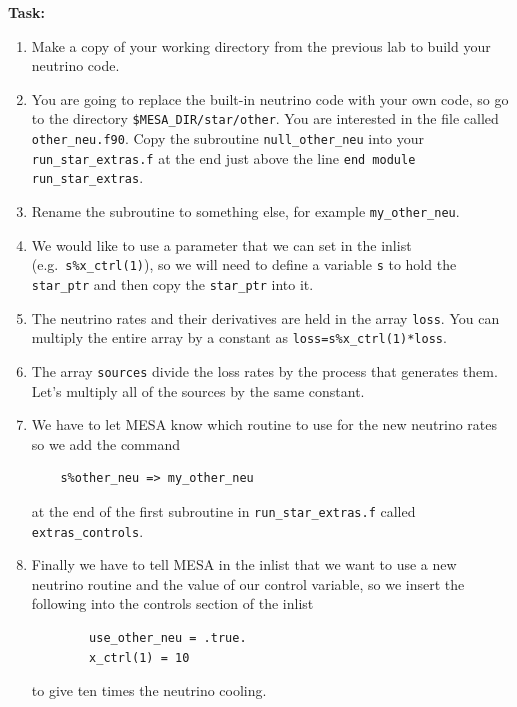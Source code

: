 \documentclass{article}
\begin{document}
\textbf{Task:}
\begin{enumerate}
 \setlength\itemsep{0em}
 \item 
Make a copy of your working directory from the previous lab to build your neutrino code.
\item 
You are going to replace the built-in neutrino code with your own code, so go to the directory \texttt{\$MESA\_DIR/star/other}.  You are interested in the file called \texttt{other\_neu.f90}.  Copy the subroutine \texttt{null\_other\_neu} into your \texttt{run\_star\_extras.f} at the end just above the line \texttt{end module run\_star\_extras}.
\item Rename the subroutine to something else, for example \texttt{my\_other\_neu}.
\item 
We would like to use a parameter that we can set in the inlist (e.g.\ \texttt{s\%x\_ctrl(1)}), so we will need to define a variable \texttt{s} to hold the \texttt{star\_ptr} and then copy the \texttt{star\_ptr} into it.
\item 
The neutrino rates and their derivatives are held in the array \texttt{loss}.  You can multiply the entire array by a constant as \texttt{loss=s\%x\_ctrl(1)*loss}.  
\item 
The array \texttt{sources} divide the loss rates by the process that generates them.  Let's multiply all of the sources by the same constant.
\item
We have to let MESA know which routine to use for the new neutrino rates so we add the command 
\begin{verbatim}
    s%other_neu => my_other_neu
\end{verbatim}
at the end of the first subroutine in \texttt{run\_star\_extras.f} called \texttt{extras\_controls}.
\item
Finally we have to tell MESA in the inlist that we want to use a new neutrino routine and the value of our control variable, so we insert the following into the controls section of the inlist
\begin{verbatim}
        use_other_neu = .true.
        x_ctrl(1) = 10
\end{verbatim}
to give ten times the neutrino cooling.
\end{enumerate}
\end{document}

